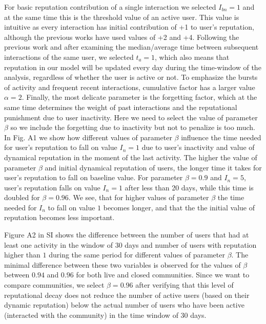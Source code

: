 For basic reputation contribution of a single interaction we selected $I_{bn} = 1$ and at the same time this is the threshold value of an active user. This value is intuitive as every interaction has initial contribution of +1 to user's reputation, although the previous works have used values of +2 and +4. Following the previous work and after examining the median/average time between subsequent interactions of the same user, we selected $t_a = 1$, which also means that reputation in our model will be updated every day during the time-window of the analysis, regardless of whether the user is active or not. To emphasize the bursts of activity and frequent recent interactions, cumulative factor has a larger value $\alpha = 2$. Finally, the most delicate parameter is the forgetting factor, which at the same time determines the weight of past interactions and the reputational punishment due to user inactivity. Here we need to select the value of parameter $\beta$ so we include the forgetting due to inactivity but not to penalize is too much. In Fig. A1 we show how different values of parameter $\beta$ influence the time needed for user's reputation to fall on value $I_{n}=1$ due to user's inactivity and value of dynamical reputation in the moment of the last activity. The higher the value of parameter $\beta$ and initial dynamical reputation of users, the longer time it takes for user's reputation to fall on baseline value. For parameter $\beta=0.9$ and $I_{n}=5$, user's reputation falls on value $I_{n}=1$ after less than 20 days, while this time is doubled for $\beta=0.96$. We see, that for higher values of parameter $\beta$ the time needed for $I_{n}$ to fall on value $1$ becomes longer, and that the the initial value of reputation becomes less important. 

Figure A2 in SI shows the difference between the number of users that had at least one activity in the window of 30 days and number of users with reputation higher than $1$ during the same period for different values of parameter $\beta$. The minimal difference between these two variables is observed for the values of $\beta$ between $0.94$ and $0.96$ for both live and closed communities. Since we want to compare communities, we select $\beta = 0.96$ after verifying that this level of reputational decay does not reduce the number of active users (based on their dynamic reputation) below the actual number of users who have been active (interacted with the community) in the time window of 30 days. 

